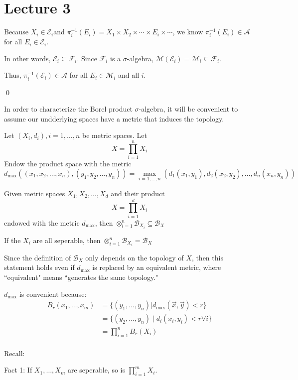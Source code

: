\documentclass[x11names,reqno,14pt]{extarticle}
\begin{document}
\section*{Lecture 3}

Because $X_i \in \mathcal{E}_i$and $\pi_i^{-1}(E_i) = X_1\times X_2\times \cdots \times E_i \times \cdots $, we know $\pi_i^{-1}(E_i)\in\mathcal{A}$ for all $E_i\in\mathcal{E}_i$. 

In other words, $\mathcal{E}_i\subseteq\mathcal{F}_i$. Since $\mathcal{F}_i$ is a $\sigma$-algebra, $\mathcal{M}(\mathcal{E}_i) = \mathcal{M}_i\subseteq\mathcal{F}_i$. 

Thus, $\pi_i^{-1}(\mathcal{E}_i) \in \mathcal{A}$ for all $E_i \in \mathcal{M}_i$ and all $i$. 

\qed

In order to characterize the Borel product $\sigma$-algebra, it will be convenient to assume our undderlying spaces have a metric that induces the topology. 



Let $(X_i, d_i), i = 1, \dots, n$ be metric spaces. 
Let
\[
X = \prod_{i=1}^nX_i
\]
Endow the product space with the metric
\[
d_{\max}((x_1, x_2, \dots, x_n), (y_1, y_2, \dots, y_n)) = \max_{i=1, \dots, n}(d_1(x_1, y_1), d_2(x_2, y_2), \dots, d_n(x_n, y_n))
\]

\thm

Given metric spaces $X_1, X_2, \dots, X_d$ and their product
\[
X = \prod_{i=1}^dX_i
\]
endowed with the metric $d_{\max}$, then $\otimes_{i=1}^n\mathcal{B}_{X_i} \subseteq \mathcal{B}_X$

If the $X_i$ are all seperable, then $\otimes_{i=1}^n\mathcal{B}_{X_i} = \mathcal{B}_X$

\rem Since the definition of $\mathcal{B}_X$ only depends on the topology of $X$, then this statement holds even if $d_{\max}$ is replaced by an equivalent metric, where ``equivalent" means ``generates the same topology."

\rem $d_{\max}$ is convenient because:
\begin{align*}
B_r(x_1, \dots, x_m) & = \{(y_1, \dots, y_n) | d_{\max}(\vec{x}, \vec{y}) < r\} \\
							 & = \{(y_2, \dots, y_n) \mid d_i(x_i, y_i) < r \forall i\} \\
							 & = \prod_{i=1}^nB_r(X_i) \\
\end{align*}

Recall:

Fact 1: If $X_1, \dots, X_m$ are seperable, so is $\prod_{i=1}^mX_i$. 
\end{document}
